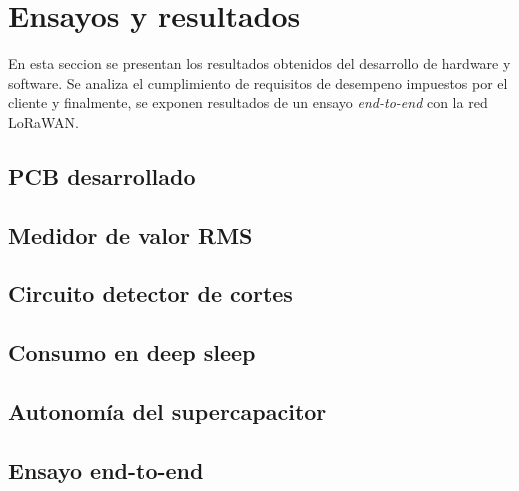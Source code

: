 
\chapter{Ensayos y resultados} %
En esta seccion se presentan los resultados obtenidos del desarrollo de hardware y software. Se analiza el cumplimiento de requisitos de desempeno impuestos por el cliente y finalmente, se exponen resultados de un ensayo \textit{end-to-end} con la red LoRaWAN.
\label{Chapter4} %


\section{PCB desarrollado}
\label{sec:pruebasHW}

\section{Medidor de valor RMS}\label{ensayo_medidor_rms}

\section{Circuito detector de cortes}

\section{Consumo en deep sleep}

\section{Autonom\'{i}a del supercapacitor}

\section{Ensayo end-to-end}